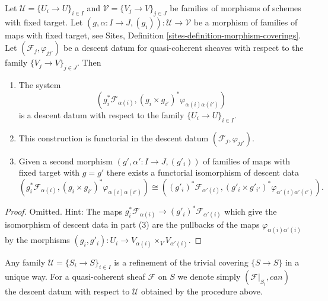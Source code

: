 \begin{lemma}
\label{lemma-refine-descent-datum}
Let $\mathcal{U} = \{U_i \to U\}_{i \in I}$ and
$\mathcal{V} = \{V_j \to V\}_{j \in J}$
be families of morphisms of schemes with fixed target.
Let $(g, \alpha : I \to J, (g_i)) : \mathcal{U} \to \mathcal{V}$
be a morphism of families of maps with fixed target, see
Sites, Definition \ref{sites-definition-morphism-coverings}.
Let $(\mathcal{F}_j, \varphi_{jj'})$ be a descent
datum for quasi-coherent sheaves with respect to the
family $\{V_j \to V\}_{j \in J}$. Then
\begin{enumerate}
\item The system
$$
\left(g_i^*\mathcal{F}_{\alpha(i)},
(g_i \times g_{i'})^*\varphi_{\alpha(i)\alpha(i')}\right)
$$
is a descent datum with respect to the family $\{U_i \to U\}_{i \in I}$.
\item This construction is functorial in the descent datum
$(\mathcal{F}_j, \varphi_{jj'})$.
\item Given a second morphism $(g', \alpha' : I \to J, (g'_i))$
of families of maps with fixed target with $g = g'$
there exists a functorial isomorphism of descent data
$$
(g_i^*\mathcal{F}_{\alpha(i)},
(g_i \times g_{i'})^*\varphi_{\alpha(i)\alpha(i')})
\cong
((g'_i)^*\mathcal{F}_{\alpha'(i)},
(g'_i \times g'_{i'})^*\varphi_{\alpha'(i)\alpha'(i')}).
$$
\end{enumerate}
\end{lemma}

\begin{proof}
Omitted. Hint: The maps
$g_i^*\mathcal{F}_{\alpha(i)} \to (g'_i)^*\mathcal{F}_{\alpha'(i)}$
which give the isomorphism of descent data in part (3)
are the pullbacks of the maps $\varphi_{\alpha(i)\alpha'(i)}$ by the
morphisms $(g_i, g'_i) : U_i \to V_{\alpha(i)} \times_V V_{\alpha'(i)}$.
\end{proof}

\noindent
Any family $\mathcal{U} = \{S_i \to S\}_{i \in I}$ is a refinement of
the trivial covering $\{S \to S\}$ in a unique way. For
a quasi-coherent sheaf $\mathcal{F}$ on $S$ we denote simply
$(\mathcal{F}|_{S_i}, can)$ the descent datum with respect to
$\mathcal{U}$ obtained by the procedure above.

